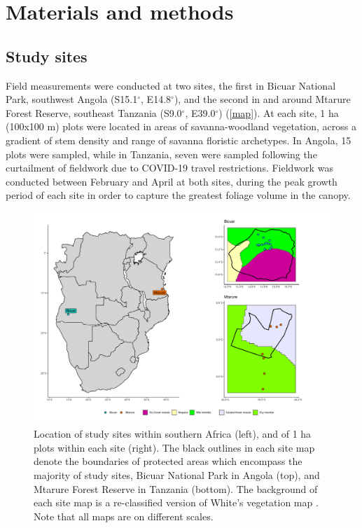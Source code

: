 \documentclass[11pt,a4paper]{article}
\begin{document}
\section{Materials and methods}

\subsection{Study sites}

Field measurements were conducted at two sites, the first in Bicuar National Park, southwest Angola (S15.1$^\circ$, E14.8$^\circ$), and the second in and around Mtarure Forest Reserve, southeast Tanzania (S9.0$^\circ$, E39.0$^\circ$) (\autoref{map}). At each site, 1 ha (100x100 m) plots were located in areas of savanna-woodland vegetation, across a gradient of stem density and range of savanna floristic archetypes. In Angola, 15 plots were sampled, while in Tanzania, seven were sampled following the curtailment of fieldwork due to COVID-19 travel restrictions. Fieldwork was conducted between February and April at both sites, during the peak growth period of each site in order to capture the greatest foliage volume in the canopy.

\begin{figure}
	\includegraphics[width=\linewidth]{map}
	\caption{Location of study sites within southern Africa (left), and of 1 ha plots within each site (right). The black outlines in each site map denote the boundaries of protected areas which encompass the majority of study sites, Bicuar National Park in Angola (top), and Mtarure Forest Reserve in Tanzania (bottom). The background of each site map is a re-classified version of White's vegetation map \citep{White1983}. Note that all maps are on different scales.}
	\label{map}
\end{figure}
\end{document}
